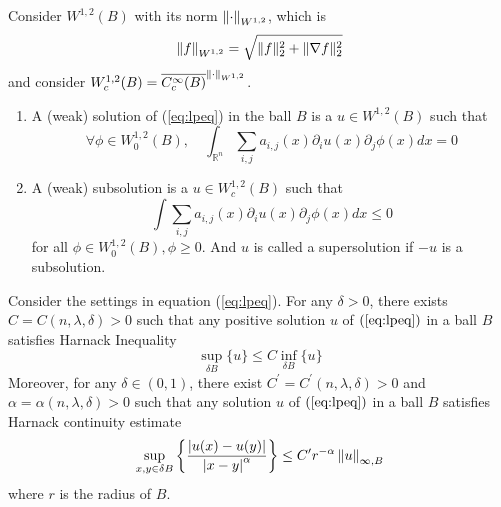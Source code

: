 \noindent Consider $W^{1,2}(B)$ with its norm $\left\lVert\cdot\right\lVert_{W^{1,2}}$, which is
\begin{equation*}
	\left\lVert f\right\lVert_{W^{1,2}} = \sqrt{\|f\|_2^2+\|\nabla f\|_2^2}
\end{equation*}
and consider $W_c^{1,2}(B) = \overline{C^\infty_c(B)}^{\left\lVert\cdot\right\lVert_{W^{1,2}}}$. 
\begin{defn}
	\begin{enumerate}[label = (\arabic{*})]
		\item A (weak) solution of (\ref{eq:lpeq}) in the ball $B$ is a $u \in W^{1,2}(B)$ such that
	\begin{equation*}
		\forall \phi \in W_0^{1,2}(B), \quad \int_{\mathbb{R}^n} \sum_{i, j} a_{i, j}(x) \partial_i u(x) \partial_j \phi(x) d x=0
	\end{equation*}
		\item A (weak) subsolution is a $u \in W_c^{1,2}(B)$ such that
		\begin{equation*}
			\int \sum_{i, j} a_{i, j}(x) \partial_i u(x) \partial_j \phi(x) d x \leq 0
		\end{equation*}
		for all $\phi \in W_0^{1,2}(B), \phi \geq 0$. And $u$ is called a supersolution if $-u$ is a subsolution.
	\end{enumerate}
\end{defn}

\begin{thm}\label{thm:harnack}
	Consider the settings in equation (\ref{eq:lpeq}). For any $\delta > 0$, there exists $C = C(n,\lambda,\delta) > 0$ such that any positive solution $u$ of $(\ref{eq:lpeq})$ in a ball $B$ satisfies Harnack Inequality
	\begin{equation*}
		\sup _{\delta B}\{u\} \leq C \inf _{\delta B}\{u\}
	\end{equation*}
	Moreover, for any $\delta \in (0,1)$, there exist $C^\prime = C^\prime(n,\lambda,\delta) > 0$ and $\alpha = \alpha(n,\lambda,\delta) > 0$ such that any solution $u$ of $(\ref{eq:lpeq})$ in a ball $B$ satisfies Harnack continuity estimate
	\begin{equation*}
		\sup_{x,y\in\delta B}\left\{\frac{\left\lvert u(x)-u(y)\right\lvert}{\left\lvert x-y\right\lvert^\alpha}\right\} \leq C^\prime r^{-\alpha}\left\lVert u\right\lVert_{\infty,B}
	\end{equation*}
	where $r$ is the radius of $B$.
\end{thm}

